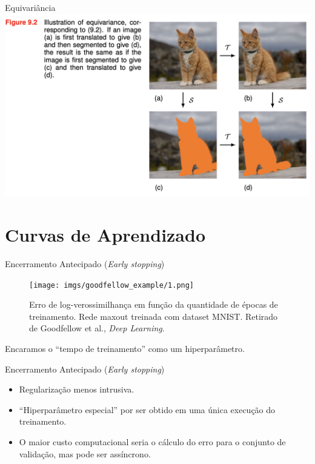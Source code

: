 \documentclass{beamer}
\begin{document}
\begin{frame}{Equivariância}
\centering
\includegraphics[width=\textwidth,height=0.7\textheight,keepaspectratio]{imgs/bishop_example/9.png}
\end{frame}


\section{Curvas de Aprendizado}
\begin{frame}{Encerramento Antecipado (\textit{Early stopping})}
\begin{figure}[H]
    \centering
    \texttt{[image: imgs/goodfellow\_example/1.png]}
    \caption{Erro de log-verossimilhança em função da quantidade de épocas de treinamento. Rede maxout treinada com dataset MNIST. Retirado de Goodfellow et al., \textit{Deep Learning}.}
\end{figure}
Encaramos o ``tempo de treinamento'' como um hiperparâmetro.
\end{frame}


\begin{frame}{Encerramento Antecipado (\textit{Early stopping})}
  \begin{itemize}
    \item Regularização menos intrusiva.
    \item ``Hiperparâmetro especial'' por ser obtido em uma única execução do treinamento.
    \item O maior custo computacional seria o cálculo do erro para o conjunto de validação, mas pode ser assíncrono.
  \end{itemize}
\end{frame}
\end{document}
